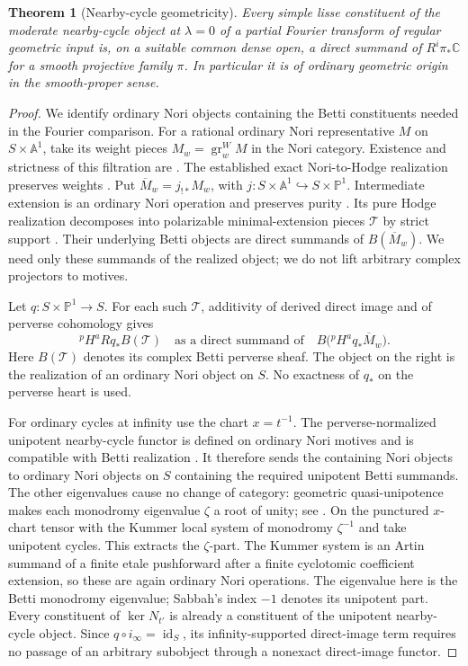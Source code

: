 \documentclass[11pt]{article}
\numberwithin{equation}{section}
\newtheorem{theorem}{Theorem}[section]
\theoremstyle{definition}
\theoremstyle{remark}
\newcommand{\C}{\mathbb C}
\newcommand{\A}{\mathbb A}
\newcommand{\id}{\operatorname{id}}
\newcommand{\pH}{{}^{p}\!H}
\newcommand{\gr}{\operatorname{gr}}
\begin{document}
\begin{theorem}[Nearby-cycle geometricity]\label{thm:nearby-geometric}
Every simple lisse constituent of the moderate nearby-cycle object at
$\lambda=0$ of a partial Fourier transform of regular geometric input is,
on a suitable common dense open, a direct summand of $R^i\pi_*\C$ for
a smooth projective family $\pi$. In particular it is of ordinary
geometric origin in the smooth-proper sense.
\end{theorem}
\begin{proof}
We identify ordinary Nori objects containing the Betti constituents
needed in the Fourier comparison. For a rational ordinary Nori
representative $M$ on $S\times\A^1$, take its weight pieces
$M_w=\gr^W_wM$ in the Nori category. Existence and strictness of this
filtration are \cite[Corollary~6.16 and Proposition~6.17]{IvorraMorel}.
The established exact Nori-to-Hodge realization preserves weights
\cite[Theorem~0.1]{Tubach}. Put
$\overline M_w=j_{!*}M_w$, with
$j:S\times\A^1\hookrightarrow S\times\mathbb P^1$.
Intermediate extension is an ordinary Nori operation and preserves
purity \cite[\S6.7, Proposition~6.20]{IvorraMorel}.
Its pure Hodge realization decomposes into polarizable minimal-extension
pieces $\mathcal T$ by strict support
\cite[\S1.2 and Theorem~1.3]{SaitoGuide}. Their underlying Betti objects
are direct summands of $B(\overline M_w)$. We need only these summands
of the realized object; we do not lift arbitrary complex projectors to
motives.

Let $q:S\times\mathbb P^1\to S$. For each such $\mathcal T$,
additivity of derived direct image and of perverse cohomology gives
\[
 \pH^a Rq_*B(\mathcal T)
 \quad\text{as a direct summand of}\quad
 B\bigl(\pH^a q_*\overline M_w\bigr).
\]
Here $B(\mathcal T)$ denotes its complex Betti perverse sheaf. The
object on the right is the realization of an ordinary Nori object on
$S$. No exactness of $q_*$ on the perverse heart is used.

For ordinary cycles at infinity use the chart $x=t^{-1}$. The
perverse-normalized unipotent nearby-cycle functor is defined on
ordinary Nori motives and is compatible with Betti realization
\cite[Corollary~3.14 and \S3.5]{IvorraMorel}. It therefore sends the
containing Nori objects to ordinary Nori objects on $S$ containing the
required unipotent Betti summands. The other eigenvalues cause no change
of category: geometric quasi-unipotence makes each monodromy eigenvalue
$\zeta$ a root of unity; see
\cite[(1.1.5) and (2.1.6)--(2.1.7)]{SaitoGuide}.
On the punctured $x$-chart tensor with the Kummer local system of
monodromy $\zeta^{-1}$ and take unipotent cycles. This extracts the
$\zeta$-part. The Kummer system is an Artin summand of a finite etale
pushforward after a finite cyclotomic coefficient extension, so these
are again ordinary Nori operations. The eigenvalue here is the Betti
monodromy eigenvalue; Sabbah's index $-1$ denotes its unipotent part.
Every constituent of $\ker N_{t'}$ is already a constituent of the
unipotent nearby-cycle object. Since $q\circ i_\infty=\id_S$, its
infinity-supported direct-image term requires no passage of an
arbitrary subobject through a nonexact direct-image functor.


\end{proof}
\end{document}

